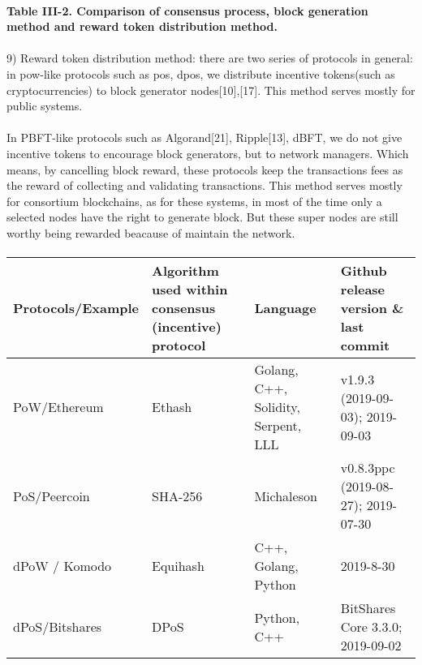 \documentclass[]{article}
\begin{document}
\begin{CJK*}{UTF8}{gbsn}
\paragraph{Table III-2. Comparison of consensus process, block generation method and reward token distribution method.}

\paragraph{}
9) Reward token distribution method: there are two series of protocols in general: in pow-like protocols such as pos, dpos, we distribute incentive tokens(such as cryptocurrencies) to block generator nodes[10],[17]. This method serves mostly for public systems. 
\paragraph{}
In PBFT-like protocols such as Algorand[21], Ripple[13], dBFT, we do not give incentive tokens to encourage block generators, but to network managers. Which means, by cancelling block reward, these protocols keep the transactions fees as the reward of collecting and validating transactions. This method serves mostly for consortium blockchains, as for these systems, in most of the time only a selected nodes have the right to generate block. But these super nodes are still worthy being rewarded beacause of maintain the network.
\paragraph{}
\begin{tabular}{p{2cm}p{3cm}p{3cm}p{3cm}}
\hline
Protocols/E\-xample 
& Algorithm used within consensus (incentive) protocol 
& Language 
& Github release version \& last commit \\ \hline

PoW/Ethe\-reum  
& Ethash & Golang, C++, Solidity, Serpent, LLL & 	v1.9.3 (2019-09-03); 2019-09-03 \\ \hline

PoS/Peercoin & SHA-256 & Michaleson & 	v0.8.3ppc (2019-08-27); 2019-07-30 \\ \hline

dPoW / Komodo & Equihash & C++, Golang, Python & 2019-8-30 \\ \hline

dPoS/\newline Bitshares  & DPoS & Python, C++ & BitShares Core 3.3.0; 2019-09-02  \\ \hline


\end{tabular}
\end{CJK*}
\end{document}
